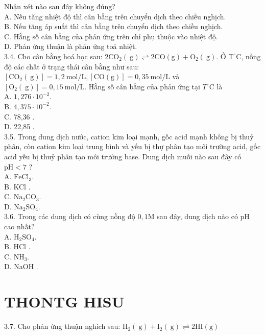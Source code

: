 \documentclass[10pt]{article}
\begin{document}
Nhận xét nào sau đây không đúng?\\
A. Nếu tăng nhiệt độ thì cân bằng trên chuyển dịch theo chiều nghịch.\\
B. Nếu tăng áp suất thì cân bằng trên chuyển dịch theo chiều nghịch.\\
C. Hằng số cân bằng của phản ứng trên chỉ phụ thuộc vào nhiệt độ.\\
D. Phản ứng thuận là phản ứng toả nhiệt.\\
3.4. Cho cân bằng hoá học sau: $2 \mathrm{CO}_{2}(\mathrm{~g}) \rightleftharpoons 2 \mathrm{CO}(\mathrm{g})+\mathrm{O}_{2}(\mathrm{~g})$. Ở $\mathrm{T}^{\circ} \mathrm{C}$, nồng độ các chất ở trạng thái cân bằng như sau: $\left[\mathrm{CO}_{2}(\mathrm{~g})\right]=1,2 \mathrm{~mol} / \mathrm{L},[\mathrm{CO}(\mathrm{g})]=0,35 \mathrm{~mol} / \mathrm{L}$ và $\left[\mathrm{O}_{2}(\mathrm{~g})\right]=0,15 \mathrm{~mol} / \mathrm{L}$. Hằng số cân bằng của phản ứng tại $T^{\circ} \mathrm{C}$ là\\
A. $1,276 \cdot 10^{-2}$.\\
B. $4,375 \cdot 10^{-2}$.\\
C. 78,36 .\\
D. 22,85 .\\
3.5. Trong dung dịch nước, cation kim loại mạnh, gốc acid mạnh không bị thuỷ phân, còn cation kim loại trung bình và yếu bị thự phân tạo môi trường acid, gốc acid yếu bị thuỷ phân tạo môi trường base. Dung dịch muối nào sau đây có $\mathrm{pH}<7$ ?\\
A. $\mathrm{FeCl}_{3}$.\\
B. KCl .\\
C. $\mathrm{Na}_{2} \mathrm{CO}_{3}$.\\
D. $\mathrm{Na}_{2} \mathrm{SO}_{4}$.\\
3.6. Trong các dung dịch có cùng nồng độ $0,1 \mathrm{M}$ sau đây, dung dịch nào có pH cao nhất?\\
A. $\mathrm{H}_{2} \mathrm{SO}_{4}$.\\
B. HCl .\\
C. $\mathrm{NH}_{3}$.\\
D. NaOH .

\section*{THONTG HISU}
3.7. Cho phản ứng thuận nghich sau: $\mathrm{H}_{2}(\mathrm{~g})+\mathrm{I}_{2}(\mathrm{~g}) \rightleftharpoons 2 \mathrm{HI}(\mathrm{g})$
\end{document}
